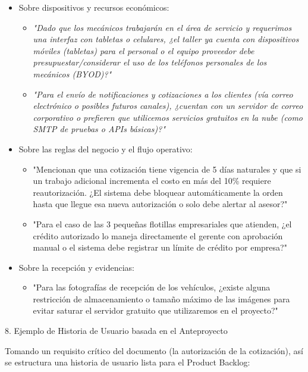 \documentclass[
  spanish,
  11pt,
  letterpaper,
]{article}
\begin{document}
\begin{itemize}
\item
  Sobre dispositivos y recursos económicos:

  \begin{itemize}
  \item
    \emph{"Dado que los mecánicos trabajarán en el área de servicio y
    requerimos una interfaz con tabletas o celulares, ¿el taller ya
    cuenta con dispositivos móviles (tabletas) para el personal o el
    equipo proveedor debe presupuestar/considerar el uso de los
    teléfonos personales de los mecánicos (BYOD)?"}
  \item
    \emph{"Para el envío de notificaciones y cotizaciones a los clientes
    (vía correo electrónico o posibles futuros canales), ¿cuentan con un
    servidor de correo corporativo o prefieren que utilicemos servicios
    gratuitos en la nube (como SMTP de pruebas o APIs básicas)?"}
  \end{itemize}
\item
  Sobre las reglas del negocio y el flujo operativo:

  \begin{itemize}
  \item
    "Mencionan que una cotización tiene vigencia de 5 días naturales y
    que si un trabajo adicional incrementa el costo en más del 10\%
    requiere reautorización. ¿El sistema debe bloquear automáticamente
    la orden hasta que llegue esa nueva autorización o solo debe alertar
    al asesor?"
  \item
    "Para el caso de las 3 pequeñas flotillas empresariales que
    atienden, ¿el crédito autorizado lo maneja directamente el gerente
    con aprobación manual o el sistema debe registrar un límite de
    crédito por empresa?"
  \end{itemize}
\item
  Sobre la recepción y evidencias:

  \begin{itemize}
  \item
    "Para las fotografías de recepción de los vehículos, ¿existe alguna
    restricción de almacenamiento o tamaño máximo de las imágenes para
    evitar saturar el servidor gratuito que utilizaremos en el
    proyecto?"
  \end{itemize}
\end{itemize}

8. Ejemplo de Historia de Usuario basada en el Anteproyecto

Tomando un requisito crítico del documento (la autorización de la
cotización), así se estructura una historia de usuario lista para el
Product Backlog:
\end{document}
